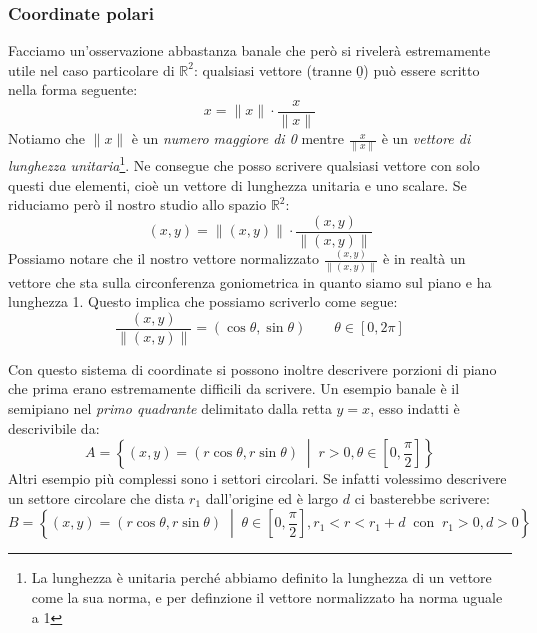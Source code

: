 \subsubsection{Coordinate polari} \label{sec_coordinatePolari}
Facciamo un'osservazione abbastanza banale che però si rivelerà estremamente utile nel caso particolare di $\mathbb{R}^2$: qualsiasi vettore (tranne $\underline{0}$) può essere scritto nella forma seguente:
\begin{equation*}
	x = \lVert x \rVert \cdot \dfrac{x}{\lVert x \rVert}
\end{equation*}
Notiamo che $\lVert x \rVert$ è un \textit{numero maggiore di 0} mentre $\frac{x}{\lVert x \rVert}$ è un \textit{vettore di lunghezza unitaria}\footnote{La lunghezza è unitaria perché abbiamo definito la lunghezza di un vettore come la sua norma, e per definzione il vettore normalizzato ha norma uguale a 1}. Ne consegue che posso scrivere qualsiasi vettore con solo questi due elementi, cioè un vettore di lunghezza unitaria e uno scalare. Se riduciamo però il nostro studio allo spazio $\mathbb{R}^2$:
\begin{equation*}
	(x, y) = \lVert (x, y) \rVert \cdot \dfrac{(x, y)}{\lVert (x, y) \rVert}
\end{equation*}
Possiamo notare che il nostro vettore normalizzato $\frac{(x, y)}{\lVert (x, y) \rVert}$ è in realtà un vettore che sta sulla circonferenza goniometrica in quanto siamo sul piano e ha lunghezza 1. Questo implica che possiamo scriverlo come segue:
\begin{equation*}
	\dfrac{(x, y)}{\lVert (x, y) \rVert} = (\cos{\theta}, \sin{\theta}) \qquad \theta \in [0, 2\pi]
\end{equation*}


Con questo sistema di coordinate si possono inoltre descrivere porzioni di piano che prima erano estremamente difficili da scrivere. Un esempio banale è il semipiano nel \textit{primo quadrante} delimitato dalla retta $y = x$, esso indatti è descrivibile da:
\begin{equation*}
	A = \left\{(x, y) = (r\cos{\theta}, r\sin{\theta}) \; \middle|\; r > 0, \theta \in \left[0, \dfrac{\pi}{2} \right] \right\}
\end{equation*}
Altri esempio più complessi sono i settori circolari. Se infatti volessimo descrivere un settore circolare che dista $r_1$ dall'origine ed è largo $d$ ci basterebbe scrivere:
\begin{equation*}
	B = \left\{(x, y) = (r\cos{\theta}, r\sin{\theta}) \; \middle|\; \theta \in \left[0, \dfrac{\pi}{2}\right], r_1 < r < r_1 + d \;\; \text{con}\;\; r_1 > 0, d > 0 \right\}
\end{equation*}

